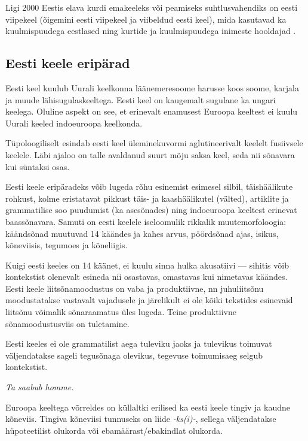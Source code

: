 \documentclass[]{../metanetpaper}
\begin{document}
\begin{multicols}{2}
Ligi 2000 Eestis elava kurdi emakeeleks või peamiseks suhtlusvahendiks on eesti viipekeel (õigemini eesti viipekeel ja viibeldud eesti keel), mida kasutavad ka kuulmispuudega eestlased ning kurtide ja kuulmispuudega inimeste hooldajad \cite{Sign}. 

\subsection{Eesti keele eripärad}

Eesti keel kuulub Uurali keelkonna läänemeresoome harusse koos soome, karjala ja muude lähisugulaskeeltega. 
Eesti keel on kaugemalt sugulane ka ungari keelega. 
Oluline aspekt on see, et erinevalt enamusest Euroopa keeltest ei kuulu Uurali keeled indoeuroopa keelkonda.

Tüpoloogiliselt esindab eesti keel üle\-minekuvormi aglutineerivalt keelelt fusiiv\-sele keelele. 
Läbi ajaloo on talle avaldanud suurt mõju saksa keel, seda nii sõnavara kui süntaksi osas.

Eesti keele eripäradeks võib lugeda rõhu esinemist esimesel silbil,  täishäälikute rohkust, kolme eristatavat pikkust täis- ja kaashäälikutel (välted), artiklite ja grammatilise soo puudumist (ka asesõnades) ning indoeuroopa keeltest erinevat baassõnavara. 
Samuti on eesti keelele iseloomulik rikkalik muutemorfoloogia: käändsõnad muutuvad 14 käändes ja kahes arvus, pöördsõnad ajas, isikus, kõneviisis, tegumoes ja kõneliigis. 

Kuigi eesti keeles on 14 käänet, ei kuulu sinna hulka akusatiivi --- sihitis võib kontekstist olenevalt esineda nii osastavas, omastavas kui nimetavas käändes.
Eesti keele liitsõnamoodustus on vaba ja produktiivne, nn juhuliitsõnu moodustatakse vastavalt vajadusele ja järelikult ei ole kõiki tekstides esinevaid liitsõnu võimalik sõnaraamatus üles lugeda.
Teine produktiivne sõnamoodustusviis on tuletamine.


Eesti keeles ei ole grammatilist aega tuleviku jaoks ja tulevikus toimuvat väljendatakse sageli tegusõnaga olevikus, tegevuse toimumisaeg selgub kontekstist.

\textit{Ta saabub homme. }

Euroopa keeltega võrreldes on küllaltki erilised ka eesti keele tingiv ja kaudne kõneviis. 
Tingiva kõneviisi tunnuseks on liide \textit{-ks(i)-}, sellega väljendatakse hüpoteetilist olukorda või ebamäärast/ebakind\-lat olukorda.


\end{multicols}
\end{document}
